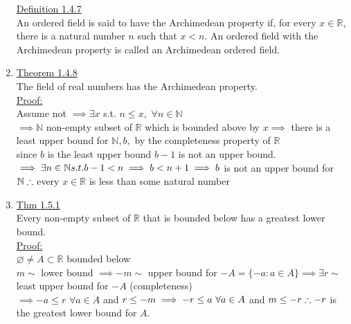\documentclass[12pt]{amsart}
\begin{document}
\begin{enumerate}
\hdashrule[0.5ex][c]{\linewidth}{0.5pt}{1.5mm}


\underline{Definition 1.4.7}\\
An ordered field is said to have the Archimedean property if, for every $x \in \mathbb{R}$, there is a natural number $n$ such that $x < n$. An ordered field with the Archimedean property is called an Archimedean ordered field.\\


\hdashrule[0.5ex][c]{\linewidth}{0.5pt}{1.5mm}


\item \underline{Theorem 1.4.8}\\
The field of real numbers has the Archimedean property.\\

\underline{Proof:}\\
Assume not $\implies \exists x$ s.t. $n \leq x,\,\, \forall n \in \mathbb{N}$\\
$\implies \mathbb{N}$ non-empty subset of $\mathbb{R}$ which is bounded above by $x \implies$ there is a least upper bound for $\mathbb{N},b,$ by the completeness property of $\mathbb{R}$\\
since $b$ is the least upper bound $b-1$ is not an upper bound.\\
$\implies \exists n \in \mathbb{N} s.t. b-1<n \implies b < n+1\\
\implies b$ is not an upper bound for $\mathbb{N}\\
\therefore$ every $x \in \mathbb{R}$ is less than some natural number\\


\hdashrule[0.5ex][c]{\linewidth}{0.5pt}{1.5mm}



\item \underline{Thm 1.5.1}\\
Every non-empty subset of $\mathbb{R}$ that is bounded below has a greatest lower bound.\\
\underline{Proof:}\\
$\varnothing \neq A \subset \mathbb{R}$ bounded below\\
$m \sim$ lower bound $\implies -m \sim$ upper bound for $- A = \{ - a : a \in A \} \implies \exists r \sim$ least upper bound for $- A$ (completeness)\\
$\implies -a \leq r \,\, \forall a \in A$ and $r \leq -m\\
\implies -r \leq a \,\, \forall a \in A$ and $m \leq - r\\
\therefore - r$ is the greatest lower bound for $A$.\\



\end{enumerate}
\end{document}
